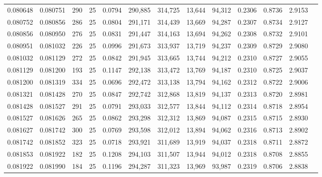 \begin{tabular}{rrrrrrrrrrrrr}
0.080648 & 0.080751 &   290 &  25 &                                     0.0794 & 290,885 & 314,725 &  13,644 &  94,312 & 0.2306 & 0.8736 & 2.9153 \\
0.080752 & 0.080856 &   286 &  25 &                                     0.0804 & 291,171 & 314,439 &  13,669 &  94,287 & 0.2307 & 0.8734 & 2.9127 \\
0.080856 & 0.080950 &   276 &  25 &                                     0.0831 & 291,447 & 314,163 &  13,694 &  94,262 & 0.2308 & 0.8732 & 2.9101 \\
0.080951 & 0.081032 &   226 &  25 &                                     0.0996 & 291,673 & 313,937 &  13,719 &  94,237 & 0.2309 & 0.8729 & 2.9080 \\
0.081032 & 0.081129 &   272 &  25 &                                     0.0842 & 291,945 & 313,665 &  13,744 &  94,212 & 0.2310 & 0.8727 & 2.9055 \\
0.081129 & 0.081200 &   193 &  25 &                                     0.1147 & 292,138 & 313,472 &  13,769 &  94,187 & 0.2310 & 0.8725 & 2.9037 \\
0.081200 & 0.081319 &   334 &  25 &                                     0.0696 & 292,472 & 313,138 &  13,794 &  94,162 & 0.2312 & 0.8722 & 2.9006 \\
0.081321 & 0.081428 &   270 &  25 &                                     0.0847 & 292,742 & 312,868 &  13,819 &  94,137 & 0.2313 & 0.8720 & 2.8981 \\
0.081428 & 0.081527 &   291 &  25 &                                     0.0791 & 293,033 & 312,577 &  13,844 &  94,112 & 0.2314 & 0.8718 & 2.8954 \\
0.081527 & 0.081626 &   265 &  25 &                                     0.0862 & 293,298 & 312,312 &  13,869 &  94,087 & 0.2315 & 0.8715 & 2.8930 \\
0.081627 & 0.081742 &   300 &  25 &                                     0.0769 & 293,598 & 312,012 &  13,894 &  94,062 & 0.2316 & 0.8713 & 2.8902 \\
0.081742 & 0.081852 &   323 &  25 &                                     0.0718 & 293,921 & 311,689 &  13,919 &  94,037 & 0.2318 & 0.8711 & 2.8872 \\
0.081853 & 0.081922 &   182 &  25 &                                     0.1208 & 294,103 & 311,507 &  13,944 &  94,012 & 0.2318 & 0.8708 & 2.8855 \\
0.081922 & 0.081990 &   184 &  25 &                                     0.1196 & 294,287 & 311,323 &  13,969 &  93,987 & 0.2319 & 0.8706 & 2.8838 \\

\end{tabular}
